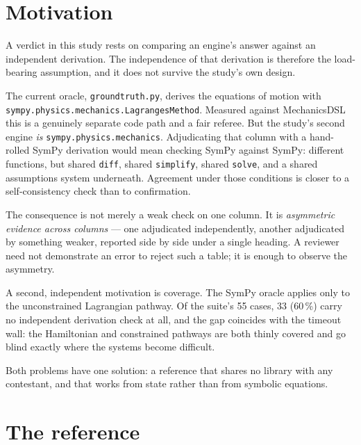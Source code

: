 \documentclass[11pt,a4paper]{article}
\begin{document}
\tableofcontents
\bigskip

\section{Motivation}

A verdict in this study rests on comparing an engine's answer against an
independent derivation. The independence of that derivation is therefore the
load-bearing assumption, and it does not survive the study's own design.

The current oracle, \texttt{groundtruth.py}, derives the equations of motion
with \texttt{sympy.physics.mechanics.LagrangesMethod}. Measured against
MechanicsDSL this is a genuinely separate code path and a fair referee. But the
study's second engine \emph{is} \texttt{sympy.physics.mechanics}. Adjudicating
that column with a hand-rolled SymPy derivation would mean checking SymPy
against SymPy: different functions, but shared \texttt{diff}, shared
\texttt{simplify}, shared \texttt{solve}, and a shared assumptions system
underneath. Agreement under those conditions is closer to a self-consistency
check than to confirmation.

The consequence is not merely a weak check on one column. It is
\emph{asymmetric evidence across columns} --- one adjudicated independently,
another adjudicated by something weaker, reported side by side under a single
heading. A reviewer need not demonstrate an error to reject such a table; it is
enough to observe the asymmetry.

A second, independent motivation is coverage. The SymPy oracle applies only to
the unconstrained Lagrangian pathway. Of the suite's 55 cases, 33 (60\,\%)
carry no independent derivation check at all, and the gap coincides with the
timeout wall: the Hamiltonian and constrained pathways are both thinly covered
and go blind exactly where the systems become difficult.

Both problems have one solution: a reference that shares no library with any
contestant, and that works from state rather than from symbolic equations.

\section{The reference}
\end{document}
